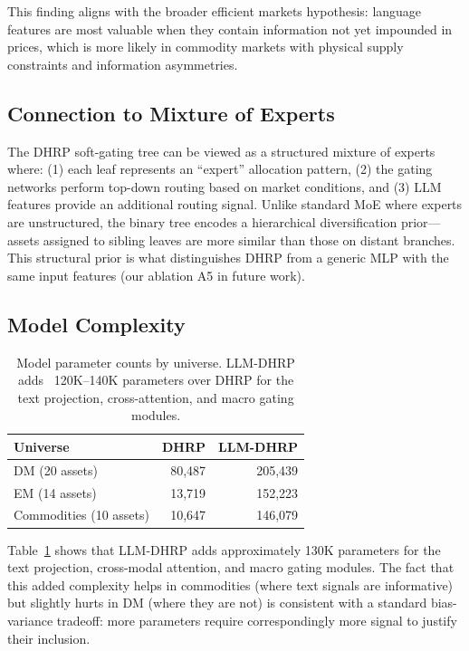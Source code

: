 \documentclass[11pt]{article}
\begin{document}
This finding aligns with the broader efficient markets hypothesis: language features are most valuable when they contain information not yet impounded in prices, which is more likely in commodity markets with physical supply constraints and information asymmetries.

\subsection{Connection to Mixture of Experts}

The DHRP soft-gating tree can be viewed as a structured mixture of experts \citep{Shazeer2017} where: (1) each leaf represents an ``expert'' allocation pattern, (2) the gating networks perform top-down routing based on market conditions, and (3) LLM features provide an additional routing signal. Unlike standard MoE where experts are unstructured, the binary tree encodes a hierarchical diversification prior---assets assigned to sibling leaves are more similar than those on distant branches. This structural prior is what distinguishes DHRP from a generic MLP with the same input features (our ablation A5 in future work).

\subsection{Model Complexity}

\begin{table}[t]
\centering
\caption{Model parameter counts by universe. LLM-DHRP adds ~120K--140K parameters over DHRP for the text projection, cross-attention, and macro gating modules.}
\label{tab:params}
\small
\begin{tabular}{lrr}
\toprule
Universe & DHRP & LLM-DHRP \\
\midrule
DM (20 assets) & 80,487 & 205,439 \\
EM (14 assets) & 13,719 & 152,223 \\
Commodities (10 assets) & 10,647 & 146,079 \\
\bottomrule
\end{tabular}
\end{table}

Table~\ref{tab:params} shows that LLM-DHRP adds approximately 130K parameters for the text projection, cross-modal attention, and macro gating modules. The fact that this added complexity helps in commodities (where text signals are informative) but slightly hurts in DM (where they are not) is consistent with a standard bias-variance tradeoff: more parameters require correspondingly more signal to justify their inclusion.
\end{document}
